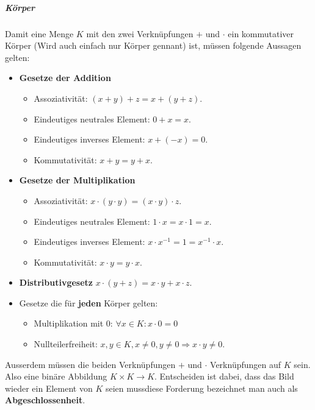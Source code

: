 \documentclass[12pt]{article}
\begin{document}
\vspace{1cm}
\subparagraph{\large Körper}
\normalsize
\begin{flushleft}
    Damit eine Menge $K$ mit den zwei Verknüpfungen $+$ und $\cdot$ ein kommutativer Körper (Wird auch einfach nur Körper gennant) ist, müssen folgende Aussagen gelten:
    \begin{itemize}
        \item \textbf{Gesetze der Addition}
        \begin{itemize}
            \item Assoziativität:
                $(x + y) + z = x + (y + z).$
            \item Eindeutiges neutrales Element:
                $0 + x = x.$
            \item Eindeutiges inverses Element: 
                $x + (-x) = 0.$
            \item Kommutativität:
                $x + y = y + x.$
        \end{itemize}
        \item \textbf{Gesetze der Multiplikation}
        \begin{itemize}
            \item Assoziativität:
                $x \cdot (y \cdot y) = (x \cdot y) \cdot z.$
            \item Eindeutiges neutrales Element:
                $1 \cdot x = x \cdot 1 = x.$
            \item Eindeutiges inverses Element:
                $x \cdot x^{-1} = 1 = x^{-1} \cdot x.$
            \item Kommutativität:
                $x \cdot y = y \cdot x.$
        \end{itemize}
        \item \textbf{Distributivgesetz}
            $x \cdot (y + z) = x \cdot y + x \cdot z.$
        \item Gesetze die für \textbf{jeden} Körper gelten:
        \begin{itemize}
            \item Multiplikation mit 0:
                $\forall x \in K: x \cdot 0 = 0$
            \item Nullteilerfreiheit:
                $x,y \in K, x \not = 0, y \not = 0 \Rightarrow x \cdot y \not = 0.$
        \end{itemize}
    \end{itemize}
    Ausserdem müssen die beiden Verknüpfungen $+$ und $\cdot$ Verknüpfungen auf $K$ sein. Also eine binäre Abbildung $K \times K \rightarrow K$.
    Entscheiden ist dabei, dass das Bild wieder ein Element von $K$ seien muss\quad diese Forderung bezeichnet man auch als \textbf{Abgeschlossenheit}.
\end{flushleft}
\end{document}
